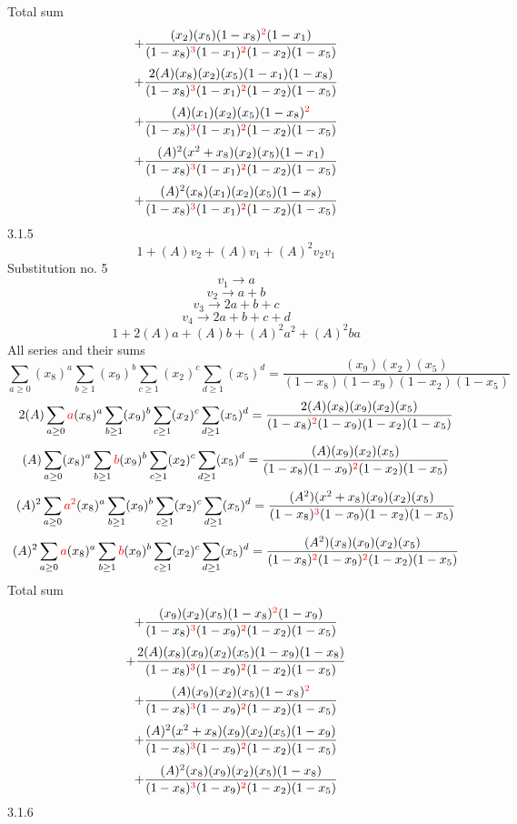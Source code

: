 \documentclass{article}
\begin{document}
Total sum
\[+\frac{(x_2)(x_5)(1-x_8)^{\textcolor{red}{2}}(1-x_1)}{(1-x_8)^{\textcolor{red}{3}}(1-x_1)^{\textcolor{red}{2}}(1-x_2)(1-x_5)}\]\[+\frac{2(A)(x_8)(x_2)(x_5)(1-x_1)(1-x_8)}{(1-x_8)^{\textcolor{red}{3}}(1-x_1)^{\textcolor{red}{2}}(1-x_2)(1-x_5)}\]\[+\frac{(A)(x_1)(x_2)(x_5)(1-x_8)^{\textcolor{red}{2}}}{(1-x_8)^{\textcolor{red}{3}}(1-x_1)^{\textcolor{red}{2}}(1-x_2)(1-x_5)}\]\[+\frac{(A)^{2}(x^{2}+x_8)(x_2)(x_5)(1-x_1)}{(1-x_8)^{\textcolor{red}{3}}(1-x_1)^{\textcolor{red}{2}}(1-x_2)(1-x_5)}\]\[+\frac{(A)^{2}(x_8)(x_1)(x_2)(x_5)(1-x_8)}{(1-x_8)^{\textcolor{red}{3}}(1-x_1)^{\textcolor{red}{2}}(1-x_2)(1-x_5)}\]
3.1.5
\[1+(A)v_2+(A)v_1+(A)^2v_2v_1\]Substitution no. 5\[v_1\rightarrow{a}\]\[v_2\rightarrow{a+b}\]\[v_3\rightarrow{2a+b+c}\]\[v_4\rightarrow{2a+b+c+d}\]\[1+2(A)a+(A)b+(A)^2a^{2}+(A)^2ba\]All series and their sums\[\sum_{a\geq{0}}(x_8)^{a}\sum_{b\geq{1}}(x_9)^{b}\sum_{c\geq{1}}(x_2)^{c}\sum_{d\geq{1}}(x_5)^{d}=\frac{(x_9)(x_2)(x_5)}{(1-x_8)(1-x_9)(1-x_2)(1-x_5)}\]\[2(A)\sum_{a\geq{0}}\textcolor{red}{a}(x_8)^{a}\sum_{b\geq{1}}(x_9)^{b}\sum_{c\geq{1}}(x_2)^{c}\sum_{d\geq{1}}(x_5)^{d}=\frac{2(A)(x_8)(x_9)(x_2)(x_5)}{(1-x_8)^{\textcolor{red}{2}}(1-x_9)(1-x_2)(1-x_5)}\]\[(A)\sum_{a\geq{0}}(x_8)^{a}\sum_{b\geq{1}}\textcolor{red}{b}(x_9)^{b}\sum_{c\geq{1}}(x_2)^{c}\sum_{d\geq{1}}(x_5)^{d}=\frac{(A)(x_9)(x_2)(x_5)}{(1-x_8)(1-x_9)^{\textcolor{red}{2}}(1-x_2)(1-x_5)}\]\[(A)^{2}\sum_{a\geq{0}}\textcolor{red}{a^{2}}(x_8)^{a}\sum_{b\geq{1}}(x_9)^{b}\sum_{c\geq{1}}(x_2)^{c}\sum_{d\geq{1}}(x_5)^{d}=\frac{(A^{2})(x^{2}+x_8)(x_9)(x_2)(x_5)}{(1-x_8)^{\textcolor{red}{3}}(1-x_9)(1-x_2)(1-x_5)}\]\[(A)^{2}\sum_{a\geq{0}}\textcolor{red}{a}(x_8)^{a}\sum_{b\geq{1}}\textcolor{red}{b}(x_9)^{b}\sum_{c\geq{1}}(x_2)^{c}\sum_{d\geq{1}}(x_5)^{d}=\frac{(A^{2})(x_8)(x_9)(x_2)(x_5)}{(1-x_8)^{\textcolor{red}{2}}(1-x_9)^{\textcolor{red}{2}}(1-x_2)(1-x_5)}\]
Total sum
\[+\frac{(x_9)(x_2)(x_5)(1-x_8)^{\textcolor{red}{2}}(1-x_9)}{(1-x_8)^{\textcolor{red}{3}}(1-x_9)^{\textcolor{red}{2}}(1-x_2)(1-x_5)}\]\[+\frac{2(A)(x_8)(x_9)(x_2)(x_5)(1-x_9)(1-x_8)}{(1-x_8)^{\textcolor{red}{3}}(1-x_9)^{\textcolor{red}{2}}(1-x_2)(1-x_5)}\]\[+\frac{(A)(x_9)(x_2)(x_5)(1-x_8)^{\textcolor{red}{2}}}{(1-x_8)^{\textcolor{red}{3}}(1-x_9)^{\textcolor{red}{2}}(1-x_2)(1-x_5)}\]\[+\frac{(A)^{2}(x^{2}+x_8)(x_9)(x_2)(x_5)(1-x_9)}{(1-x_8)^{\textcolor{red}{3}}(1-x_9)^{\textcolor{red}{2}}(1-x_2)(1-x_5)}\]\[+\frac{(A)^{2}(x_8)(x_9)(x_2)(x_5)(1-x_8)}{(1-x_8)^{\textcolor{red}{3}}(1-x_9)^{\textcolor{red}{2}}(1-x_2)(1-x_5)}\]
3.1.6
\end{document}
